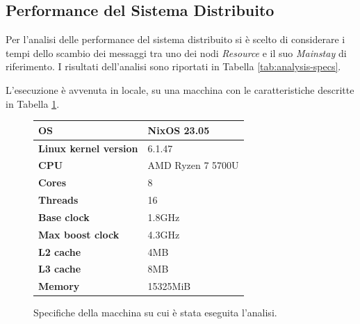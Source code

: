 \documentclass{scrartcl}
\begin{document}
\subsection{Performance del Sistema Distribuito}

Per l'analisi delle performance del sistema distribuito si è scelto di considerare i tempi dello scambio dei messaggi tra uno dei nodi \textit{Resource} e il suo \textit{Mainstay} di riferimento. I risultati dell'analisi sono riportati in Tabella \ref{tab:analysis-specs}.

L'esecuzione è avvenuta in locale, su una macchina con le caratteristiche descritte in Tabella \ref{tab:machine-specs}.

\begin{figure}[H]
    \caption{Specifiche della macchina su cui è stata eseguita l'analisi.}
    \begin{center}
        \begin{tabular}{ | l | l | }
            \hline
            \textbf{OS}                   & NixOS 23.05       \\
            \hline
            \textbf{Linux kernel version} & 6.1.47            \\
            \hline
            \textbf{CPU}                  & AMD Ryzen 7 5700U \\
            \hline
            \textbf{Cores}                & 8                 \\
            \hline
            \textbf{Threads}              & 16                \\
            \hline
            \textbf{Base clock}           & 1.8GHz            \\
            \hline
            \textbf{Max boost clock}      & 4.3GHz            \\
            \hline
            \textbf{L2 cache}             & 4MB               \\
            \hline
            \textbf{L3 cache}             & 8MB               \\
            \hline
            \textbf{Memory}               & 15325MiB          \\
            \hline
        \end{tabular}
    \end{center}
    \label{tab:machine-specs}
\end{figure}
\end{document}
